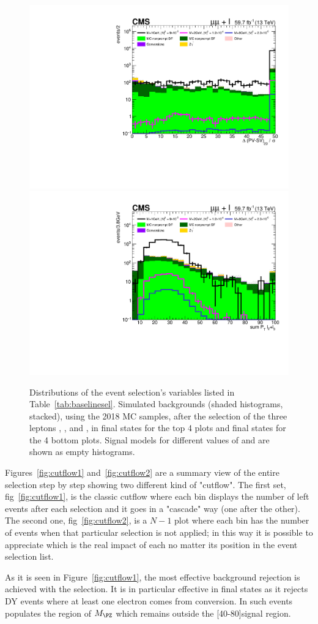 \begin{figure}[h]
  \includegraphics[clip,trim=0.9cm 0.7cm 0.7cm 0.6cm,width=.35\textwidth]{Figures/c6/selection/18/mu_sigmaDeltaPV_SV_2D__0.pdf}
  \includegraphics[clip,trim=0.9cm 0.7cm 0.7cm 0.6cm,width=.35\textwidth]{Figures/c6/selection/18/mu_sum_Pt_L2L3__0.pdf}
  \caption{Distributions of the event selection's variables listed in
    Table~\ref{tab:baselinesel}. Simulated backgrounds (shaded histograms, stacked),
    using the 2018 MC samples, 
    after the selection of the three leptons \lone, \ltwo, and \lthree,
    in \eex final states for the top 4 plots and \mmx final states for
    the 4 bottom plots.
    Signal models for different values of \mhnl and \mixpar are shown
    as empty histograms.}
  \label{fig:selection_electrons}
\end{figure}


\clearpage
Figures~\ref{fig:cutflow1} and~\ref{fig:cutflow2} are a summary view of the entire selection
step by step showing two different kind of "cutflow". The
first set, fig~\ref{fig:cutflow1}, is the classic cutflow where each
bin displays the number of left events after each selection and it goes in a
"cascade" way (one after the other). The second one,
fig~\ref{fig:cutflow2}, is a $N-1$ plot where each bin has the number
of events when that particular selection is not applied; in this way it is
possible to appreciate which is the real impact of each no matter
its position in the event selection list. 

As it is seen in Figure~\ref{fig:cutflow1}, the most effective
background rejection is achieved with the \mthreel selection. It is in
particular effective in \eex final states as it rejects DY events
where at least one electron comes from conversion. In such events
\mthreel populates the region of $M_{\PZ}$ which remains outside the
[40-80]\GeV signal region.

